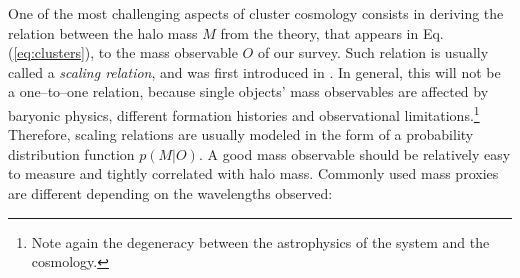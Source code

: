 
One of the most challenging aspects of cluster cosmology consists in deriving the relation between the halo mass $M$ from the theory, that appears in Eq. (\ref{eq:clusters}), to the mass observable $O$ of our survey. Such relation is usually called a \emph{scaling relation}, and was first introduced in \citet{kaiser86}. In general, this will not be a one--to--one relation, because single objects' mass observables are affected by baryonic physics, different formation histories and observational limitations.\footnote{Note again the degeneracy between the astrophysics of the system and the cosmology.} Therefore, scaling relations are usually modeled in the form of a probability distribution function $p(M|O)$. 
A good mass observable should be relatively easy to measure and tightly correlated with halo mass. Commonly used mass proxies are different depending on the wavelengths observed:
